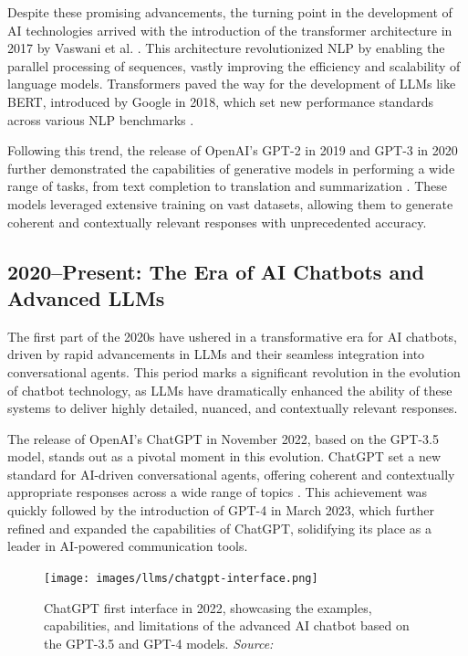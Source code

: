 Despite these promising advancements, the turning point in the development of AI technologies arrived with the introduction of the transformer architecture in 2017 by Vaswani et al. \cite{vaswani2017attention}. This architecture revolutionized NLP by enabling the parallel processing of sequences, vastly improving the efficiency and scalability of language models. Transformers paved the way for the development of LLMs like BERT, introduced by Google in 2018, which set new performance standards across various NLP benchmarks \cite{devlin2018bert}.

Following this trend, the release of OpenAI’s GPT-2 in 2019 and GPT-3 in 2020 further demonstrated the capabilities of generative models in performing a wide range of tasks, from text completion to translation and summarization \cite{radford2019language}. These models leveraged extensive training on vast datasets, allowing them to generate coherent and contextually relevant responses with unprecedented accuracy.

\subsection{2020–Present: The Era of AI Chatbots and Advanced LLMs}

The first part of the 2020s have ushered in a transformative era for AI chatbots, driven by rapid advancements in LLMs and their seamless integration into conversational agents. This period marks a significant revolution in the evolution of chatbot technology, as LLMs have dramatically enhanced the ability of these systems to deliver highly detailed, nuanced, and contextually relevant responses.

The release of OpenAI’s ChatGPT in November 2022, based on the GPT-3.5 model, stands out as a pivotal moment in this evolution. ChatGPT set a new standard for AI-driven conversational agents, offering coherent and contextually appropriate responses across a wide range of topics \cite{wikipedia2023chatgpt}. This achievement was quickly followed by the introduction of GPT-4 in March 2023, which further refined and expanded the capabilities of ChatGPT, solidifying its place as a leader in AI-powered communication tools.

\begin{figure}[h!]
    \centering
    \texttt{[image: images/llms/chatgpt-interface.png]}
    \caption{ChatGPT first interface in 2022, showcasing the examples, capabilities, and limitations of the advanced AI chatbot based on the GPT-3.5 and GPT-4 models. \textit{Source:} \cite{createwithswift2024}}
    \label{fig:chatgpt_interface}
\end{figure}

